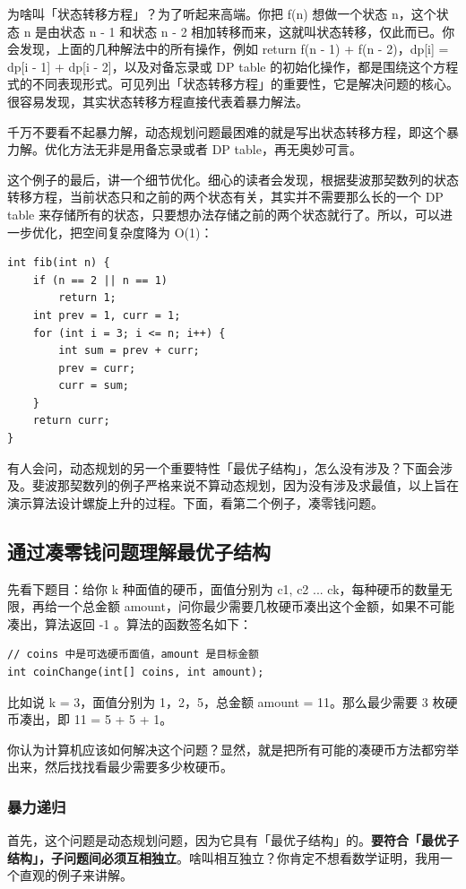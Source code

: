 \documentclass[12pt]{article}
\begin{document}
为啥叫「状态转移方程」？为了听起来高端。你把 f(n) 想做一个状态 n，这个状态 n 是由状态 n - 1 和状态 n - 2 相加转移而来，这就叫状态转移，仅此而已。你会发现，上面的几种解法中的所有操作，例如 return f(n - 1) + f(n - 2)，dp[i] = dp[i - 1] + dp[i - 2]，以及对备忘录或 DP table 的初始化操作，都是围绕这个方程式的不同表现形式。可见列出「状态转移方程」的重要性，它是解决问题的核心。很容易发现，其实状态转移方程直接代表着暴力解法。

千万不要看不起暴力解，动态规划问题最困难的就是写出状态转移方程，即这个暴力解。优化方法无非是用备忘录或者 DP table，再无奥妙可言。

这个例子的最后，讲一个细节优化。细心的读者会发现，根据斐波那契数列的状态转移方程，当前状态只和之前的两个状态有关，其实并不需要那么长的一个 DP table 来存储所有的状态，只要想办法存储之前的两个状态就行了。所以，可以进一步优化，把空间复杂度降为 O(1)：
\begin{lstlisting}
int fib(int n) {
    if (n == 2 || n == 1) 
        return 1;
    int prev = 1, curr = 1;
    for (int i = 3; i <= n; i++) {
        int sum = prev + curr;
        prev = curr;
        curr = sum;
    }
    return curr;
}
\end{lstlisting}

有人会问，动态规划的另一个重要特性「最优子结构」，怎么没有涉及？下面会涉及。斐波那契数列的例子严格来说不算动态规划，因为没有涉及求最值，以上旨在演示算法设计螺旋上升的过程。下面，看第二个例子，凑零钱问题。

\subsection{通过凑零钱问题理解最优子结构}
先看下题目：给你 k 种面值的硬币，面值分别为 c1, c2 ... ck，每种硬币的数量无限，再给一个总金额 amount，问你最少需要几枚硬币凑出这个金额，如果不可能凑出，算法返回 -1 。算法的函数签名如下：
\begin{lstlisting}
// coins 中是可选硬币面值，amount 是目标金额
int coinChange(int[] coins, int amount);
\end{lstlisting}

比如说 k = 3，面值分别为 1，2，5，总金额 amount = 11。那么最少需要 3 枚硬币凑出，即 11 = 5 + 5 + 1。

你认为计算机应该如何解决这个问题？显然，就是把所有可能的凑硬币方法都穷举出来，然后找找看最少需要多少枚硬币。

\subsubsection{暴力递归}
首先，这个问题是动态规划问题，因为它具有「最优子结构」的。\textbf{要符合「最优子结构」，子问题间必须互相独立}。啥叫相互独立？你肯定不想看数学证明，我用一个直观的例子来讲解。
\end{document}
